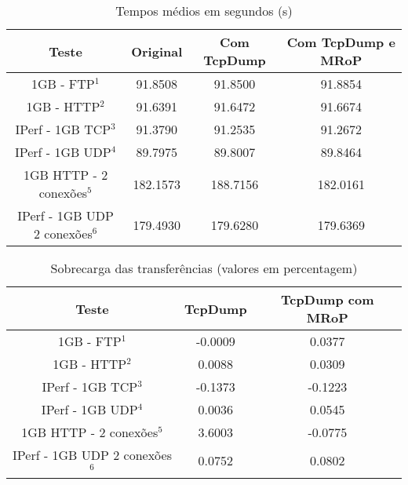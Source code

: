 \begin{table}[!htb]
\begin{center}
\caption{Tempos médios em segundos (s)}
\begin{tabular}{ | c | c | c | c |  }
\hline
Teste & \hspace {0.3cm} Original \hspace {0.3cm}& \hspace {0.2cm} Com TcpDump \hspace {0.2cm} & Com TcpDump e MRoP \\
\hline
1GB - FTP$^{1}$ & 91.8508	& 91.8500 & 91.8854 \\
1GB - HTTP$^{2}$ & 91.6391 & 91.6472 & 91.6674 \\ 
IPerf - 1GB TCP$^{3}$ & 91.3790	& 91.2535	& 91.2672 \\
IPerf - 1GB UDP$^{4}$ & 89.7975 & 89.8007 & 89.8464 \\
\hline
\hline
1GB HTTP - 2 conexões$^{5}$ & 182.1573 & 188.7156 & 182.0161 \\
IPerf - 1GB UDP 2 conexões$^{6}$ & 179.4930 & 179.6280 & 179.6369 \\
\hline
\end{tabular}
\label{tab:desempenho}
\end{center}
\end{table}

\begin{table}[!htb]
\begin{center}
\caption{Sobrecarga das transferências (valores em percentagem)}
\begin{tabular}{ | c | c | c |}
\hline
Teste & \hspace {0.3cm} TcpDump \hspace {0.3cm} & TcpDump com MRoP  \\

\hline
1GB - FTP$^{1}$ & -0.0009  & 0.0377  \\
1GB - HTTP$^{2}$ & 0.0088 &  0.0309   \\
IPerf - 1GB TCP$^{3}$ & -0.1373 &  -0.1223   \\
IPerf - 1GB UDP$^{4}$ & 0.0036 & 0.0545 \\
\hline
\hline
1GB HTTP - 2 conexões$^{5}$ & 3.6003 & -0.0775   \\
IPerf - 1GB UDP 2 conexões$^{6}$ & 0.0752 & 0.0802   \\
\hline
\end{tabular}
\label{tab:overhead}
\end{center}
\end{table}

